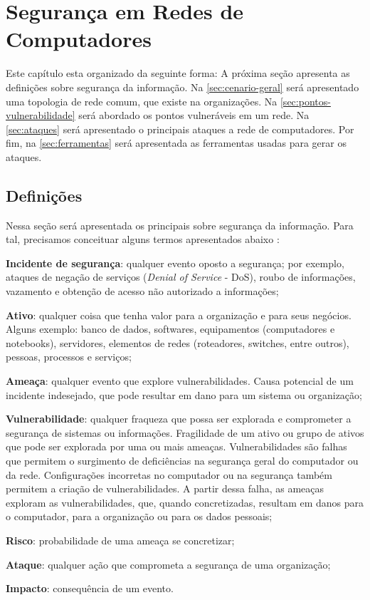 \chapter{Segurança em Redes de Computadores} \label{ch:segurança}

Este capítulo esta organizado da seguinte forma: A próxima seção apresenta as definições sobre segurança da informação. Na \autoref{sec:cenario-geral} será apresentado uma topologia de rede comum, que existe na organizações. Na \autoref{sec:pontos-vulnerabilidade} será abordado os pontos vulneráveis em um rede. Na \autoref{sec:ataques} será apresentado o principais ataques a rede de computadores. Por fim, na \autoref{sec:ferramentas} será apresentada as ferramentas usadas para gerar os ataques.

\section{Definições} \label{sec:definições}

Nessa seção será apresentada os principais sobre segurança da informação. Para tal, precisamos conceituar alguns termos apresentados abaixo \cite{esr-gestao}:

\begin{alineas}
\item \textbf{Incidente de segurança}: qualquer evento oposto a segurança; por exemplo, ataques de negação de serviços (\textit{Denial of Service} - DoS), roubo de informações, vazamento e obtenção de acesso não autorizado a informações;
 \item \textbf{Ativo}: qualquer coisa que tenha valor para a organização e para seus negócios. Alguns exemplo: banco de dados, softwares, equipamentos (computadores e notebooks), servidores, elementos de redes (roteadores, switches, entre outros), pessoas, processos e serviços;
 \item \textbf{Ameaça}: qualquer evento que explore vulnerabilidades. Causa potencial de um incidente indesejado, que pode resultar em dano para um sistema ou organização;
 \item \textbf{Vulnerabilidade}: qualquer fraqueza que possa ser explorada e comprometer a segurança de sistemas ou informações. Fragilidade de um ativo ou grupo de ativos que pode ser explorada por uma ou mais ameaças. Vulnerabilidades são falhas que permitem o surgimento de deficiências na segurança geral do computador ou da rede. Configurações incorretas no computador ou na segurança também permitem a criação de vulnerabilidades. A partir dessa falha, as ameaças exploram as vulnerabilidades, que, quando concretizadas, resultam em danos para o computador, para a organização ou para os dados pessoais;
 \item \textbf{Risco}: probabilidade de uma ameaça se concretizar;
 \item \textbf{Ataque}: qualquer ação que comprometa a segurança de uma organização;
 \item \textbf{Impacto}: consequência de um evento.
\end{alineas}

